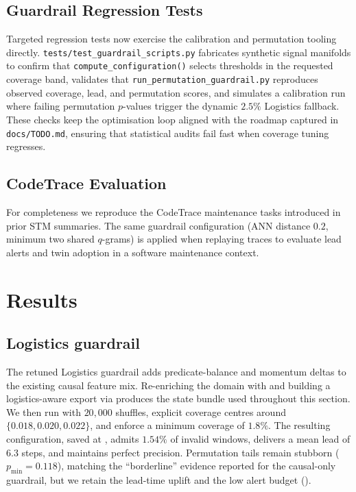 \documentclass[11pt]{article}
\begin{document}
\subsection{Guardrail Regression Tests}
Targeted regression tests now exercise the calibration and permutation tooling
directly. \texttt{tests/test\_guardrail\_scripts.py} fabricates synthetic signal
manifolds to confirm that \texttt{compute\_configuration()} selects thresholds in
the requested coverage band, validates that
\texttt{run\_permutation\_guardrail.py} reproduces observed coverage, lead, and
permutation scores, and simulates a calibration run where failing
permutation $p$-values trigger the dynamic $2.5\%$ Logistics fallback. These
checks keep the optimisation loop aligned with the roadmap captured in
\texttt{docs/TODO.md}, ensuring that statistical audits fail fast when coverage
tuning regresses.

\subsection{CodeTrace Evaluation}
For completeness we reproduce the CodeTrace maintenance tasks introduced in
prior STM summaries. The same guardrail configuration (ANN distance $0.2$,
minimum two shared $q$-grams) is applied when replaying traces to evaluate lead
alerts and twin adoption in a software maintenance context.

\section{Results}
\subsection{Logistics guardrail}
\label{subsec:permutation}
The retuned Logistics guardrail adds predicate-balance and momentum deltas to the
existing causal feature mix. Re-enriching the domain with
and building a logistics-aware export via
produces the state bundle used throughout this section. We then run
 with $20{,}000$ shuffles, explicit coverage
centres around $\{0.018, 0.020, 0.022\}$, and enforce a minimum coverage of $1.8\%$.
The resulting configuration, saved at
, admits
$1.54\%$ of invalid windows, delivers a mean lead of $6.3$ steps, and maintains
perfect precision. Permutation tails remain stubborn ($p_{\min}=0.118$), matching the
``borderline'' evidence reported for the causal-only guardrail, but we retain the
lead-time uplift and the low alert budget ().
\end{document}
